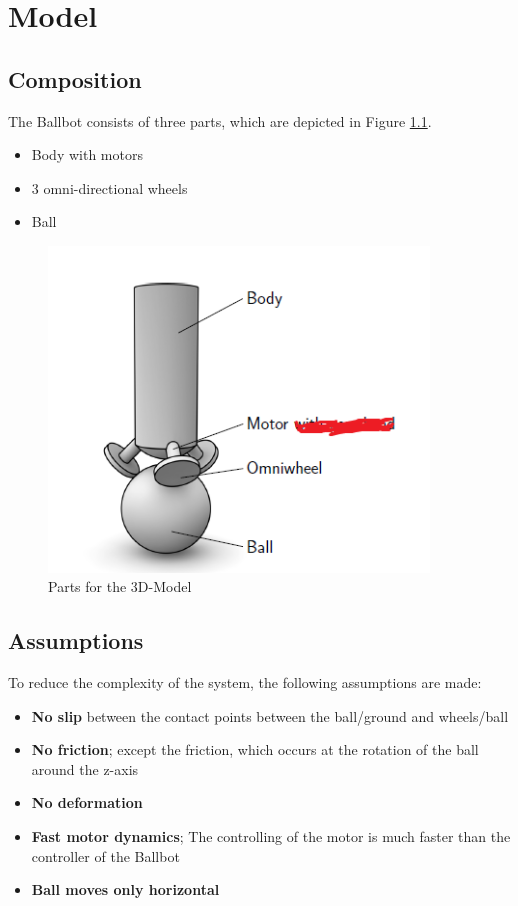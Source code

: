 \documentclass[twoside,colorback,accentcolor=tud4c,11pt]{tudreport}
\begin{document}
	\chapter{Model}
	
	\section{Composition}
	The Ballbot consists of three parts, which are depicted in Figure \ref{fig:Structure}.
	
	\begin{itemize}
		\item Body with motors
		\item 3 omni-directional wheels
		\item Ball
	\end{itemize}
	
	
	\begin{figure}[htbp]
		\centering
		\includegraphics[width=0.9\textwidth]{img/Strucuture.PNG}
		\caption{Parts for the 3D-Model}
		\label{fig:Structure}
	\end{figure}
	
	\section{Assumptions}
	
	To reduce the complexity of the system, the following assumptions are made: 
	
	\begin{itemize}
		\item \textbf{No slip} between the contact points between the ball/ground and wheels/ball
		\item \textbf{No friction}; except the friction, which occurs at the rotation of the ball around the z-axis
		\item \textbf{No deformation}
		\item \textbf{Fast motor dynamics}; The controlling of the motor is much faster than the controller of the Ballbot
		\item \textbf{Ball moves only horizontal}
	\end{itemize}
			
\end{document}
